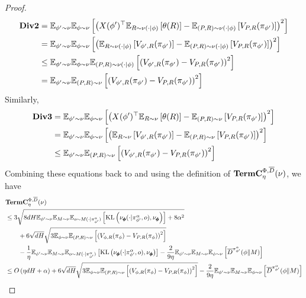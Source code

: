 \begin{proof}
\begin{align*}
     \textbf{Div2} &= \mathbb{E}_{\phi' \sim \nu}\mathbb{E}_{\phi \sim \nu}\left[\left(X(\phi')^\top\mathbb{E}_{R \sim \nu(\cdot|\phi)}\left[\theta(R)\right] - \mathbb{E}_{(P,R) \sim \nu(\cdot|\phi)}\left[V_{P,R}(\pi_{\phi'})\right] \right)^2\right]
     \\&= \mathbb{E}_{\phi' \sim \nu}\mathbb{E}_{\phi \sim \nu}\left[\left(\mathbb{E}_{R \sim \nu(\cdot|\phi)}\left[V_{\phi', R}(\pi_{\phi'})\right] - \mathbb{E}_{(P,R) \sim \nu(\cdot|\phi)}\left[V_{P,R}(\pi_{\phi'})\right] \right)^2\right]
     \\&\le \mathbb{E}_{\phi' \sim \nu}\mathbb{E}_{\phi \sim \nu}\mathbb{E}_{(P,R) \sim \nu(\cdot|\phi)}\left[\left(V_{\phi', R}(\pi_{\phi'}) - V_{P,R}(\pi_{\phi'}) \right)^2\right]
     \\&= \mathbb{E}_{\phi' \sim \nu}\mathbb{E}_{(P,R) \sim \nu}\left[\left(V_{\phi', R}(\pi_{\phi'}) - V_{P,R}(\pi_{\phi'}) \right)^2\right]
\end{align*}
Similarly,
\begin{align*}
     \textbf{Div3} &= \mathbb{E}_{\phi' \sim \nu}\mathbb{E}_{\phi \sim \nu}\left[\left(X(\phi')^\top\mathbb{E}_{R \sim \nu}\left[\theta(R)\right] - \mathbb{E}_{(P,R) \sim \nu}\left[V_{P,R}(\pi_{\phi'})\right] \right)^2\right]
     \\&= \mathbb{E}_{\phi' \sim \nu}\mathbb{E}_{\phi \sim \nu}\left[\left(\mathbb{E}_{R \sim \nu}\left[V_{\phi', R}(\pi_{\phi'})\right] - \mathbb{E}_{(P,R) \sim \nu}\left[V_{P,R}(\pi_{\phi'})\right] \right)^2\right]
     \\&\le \mathbb{E}_{\phi' \sim \nu}\mathbb{E}_{(P,R) \sim \nu}\left[\left(V_{\phi', R}(\pi_{\phi'}) - V_{P,R}(\pi_{\phi'}) \right)^2\right]
\end{align*}
Combining these equations back to  and using the definition of $\textbf{\textup{TermC}}_\eta^{\Phi, \overline{D}}(\nu)$, we have
\begin{align*}
&\rew_\eta^{\Phi, \tilD}(\nu) 
\\&\le 3\sqrt{8dH\E_{\phi' \sim \nu}\E_{M\sim \nu} \E_{o\sim M(\cdot|\pi^\alpha_{\phi'})}\left[\KL\left(\nu_{\pmb{\phi}}(\cdot|\pi_{\phi'}^\alpha, o), \nu_{\pmb{\phi}} \right)\right] + 8\alpha^2} 
\\&\qquad + 6\sqrt{dH}\sqrt{3 \E_{\phi \sim \nu}\E_{(P,R) \sim \nu}\left[\left(V_{\phi, R}(\pi_{\phi}) - V_{P,R}(\pi_{\phi}) \right)^2\right]}
\\& \qquad  - \frac{1}{\eta}\E_{\phi' \sim \nu}\E_{M\sim \nu} \E_{o\sim M(\cdot|\pi^\alpha_{\phi'})}\left[\KL\left(\nu_{\pmb{\phi}}(\cdot|\pi_{\phi'}^\alpha, o), \nu_{\pmb{\phi}} \right)\right] - \frac{2}{9\eta}\E_{\phi' \sim \nu}\E_{M \sim \nu}\E_{\phi \sim \nu}\left[\tilD^{\pi_{\phi'}^\alpha}(\phi\|M)\right]
\\&\le \order\left(\eta dH + \alpha\right) + 6\sqrt{dH}\sqrt{3\E_{\phi \sim \nu}\E_{(P,R) \sim \nu}\left[\left(V_{\phi, R}(\pi_{\phi}) - V_{P,R}(\pi_{\phi}) \right)^2\right]} - \frac{2}{9\eta}\E_{\phi' \sim \nu}\E_{M \sim \nu}\E_{\phi \sim \nu}\left[\tilD^{\pi_{\phi'}^\alpha}(\phi\|M)\right] 

\end{align*}
\end{proof}
